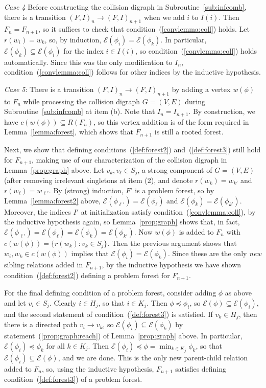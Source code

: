\documentclass[11pt,reqno]{amsart}
\theoremstyle{definition}
\numberwithin{equation}{section}
\newcommand{\pre}{\phi}
\newcommand{\sub}{\subseteq}
\newcommand{\fix}{\mathcal{E}}
\newcommand{\peq}{\preceq}
\newcommand{\strongcomp}{S}
\newcommand{\coll}{I}
\newcommand{\reach}{H}
\newcommand{\forest}{F}
\newcommand{\pair}{(F,I)}
\newcommand{\roott}{R}
\newcommand{\infcombgraphii}{(2)\xspace}
\newcommand{\infcombcombb}{(b)\xspace}
\begin{document}
\emph{Case 4} Before constructing the collision digraph in Subroutine~\ref{sub:infcomb}, there is a transition $\pair_n \to \pair_{n + 1}$ when we add $i$ to $\coll(i)$. 
Then $\forest_n = \forest_{n + 1}$, so it suffices to check that condition~(\ref{convlemma:coll}) holds. 
Let $r(w_i) = w_k$, so, by induction, $\fix(\pre_i) = \fix(\pre_k)$. 
In particular, $\fix(\pre_k) \sub \fix(\pre_i)$ for the index $i \in \coll(i)$, so condition~(\ref{convlemma:coll}) holds automatically.
Since this was the only modification to $\coll_n$, condition~(\ref{convlemma:coll}) follows for other indices by the inductive hypothesis.

\emph{Case 5}: There is a transition $\pair_n \to \pair_{n + 1}$ by adding a vertex $w(\pre)$ to $\forest_n$ while processing the collision digraph $G = (V,E)$ during Subroutine~\ref{sub:infcomb} at item \infcombcombb. 
Note that $\coll_n = \coll_{n + 1}$. 
By construction, we have $c(w(\pre)) \sub \roott(\forest_n)$, so this vertex addition is of the form required in Lemma~\ref{lemma:forest}, which shows that $\forest_{n + 1}$ is still a rooted forest.  

Next, we show that defining conditions~(\ref{def:forest2}) and~(\ref{def:forest3}) still hold for $\forest_{n + 1}$, making use of our characterization of the collision digraph in Lemma~\ref{prop:graph} above.
Let $v_k, v_{\ell} \in \strongcomp_j$, a strong component of $G = (V,E)$ (after removing irrelevant singletons at item \infcombgraphii, and denote $r(w_k) = w_{k'}$ and $r(w_{\ell}) = w_{\ell'}$.
By (strong) induction, $\forest'$ is a problem forest, so by Lemma~\ref{lemma:forest2} above, $\fix(\pre_{\ell'}) = \fix(\pre_{\ell})$ and $\fix(\pre_k) = \fix(\pre_{k'})$. 
Moreover, the indices $\coll'$ at initialization satisfy condition~(\ref{convlemma:coll}), by the inductive hypothesis again, so Lemma~\ref{prop:graph} shows that, in fact, $\fix(\pre_{\ell'}) = \fix(\pre_{\ell}) = \fix(\pre_k) = \fix(\pre_{k'})$. 
Now $w(\pre)$ is added to $\forest_n$ with $c(w(\pre)) = \{r(w_k):v_k \in \strongcomp_j\}$. 
Then the previous argument shows that $w_i,w_k \in c(w(\pre))$ implies that $\fix(\pre_i) = \fix(\pre_k)$. 
Since these are the only \emph{new} sibling relations added in $\forest_{n+1}$, by the inductive hypothesis we have shown condition~(\ref{def:forest2}) defining a problem forest for $\forest_{n+1}$. 

For the final defining condition of a problem forest, consider adding $\pre$ as above and let $v_i \in \strongcomp_j$. 
Clearly $i \in \reach_j$, so that $i \in K_j$. 
Then $\pre \peq \pre_i$, so $\fix(\pre) \sub \fix(\pre_i)$, and the second statement of condition~(\ref{def:forest3}) is satisfied. 
If $v_k \in \reach_j$, then there is a directed path $v_i \to v_k$, so $\fix(\pre_i) \sub \fix(\pre_k)$ by statement~(\ref{prop:graph:reach}) of Lemma~\ref{prop:graph} above.
In particular, $\fix(\pre_i) \peq \pre_k$ for all $k \in K_j$. 
Then $\fix(\pre_i) \peq \pre = \min_{k \in K_j} \pre_k$, so that $\fix(\pre_i) \sub \fix(\pre)$, and we are done. 
This is the only new parent-child relation added to $\forest_n$, so, using the inductive hypothesis, $\forest_{n+1}$ satisfies defining condition~(\ref{def:forest3}) of a problem forest. 
\end{document}
